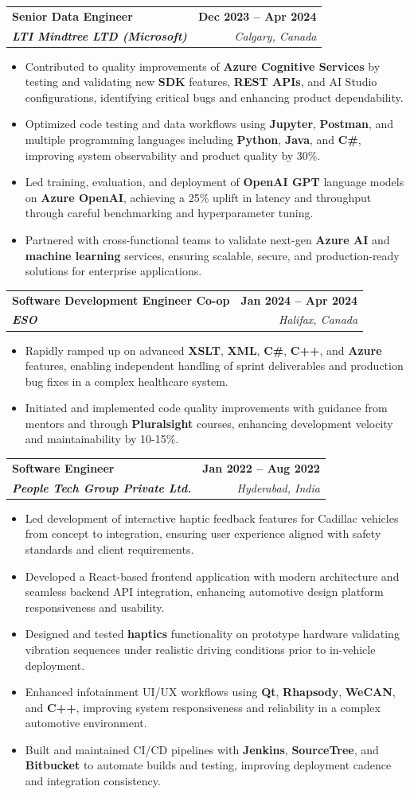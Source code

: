 \documentclass[letterpaper,11pt]{article}
\makeatletter
\newcommand{\resumeItem}[1]{
  \item\small{
    {#1 \vspace{-2pt}}
  }
}
\newcommand{\resumeSubheading}[4]{
  \vspace{-2pt}\item
    \begin{tabular*}{1.0\textwidth}[t]{l@{\extracolsep{\fill}}r}
      \textbf{#1} & \textbf{\small #2} \\
      \textit{\small#3} & \textit{\small #4} \\
    \end{tabular*}\vspace{-7pt}
}
\newcommand{\resumeItemListStart}{\begin{itemize}}
\newcommand{\resumeItemListEnd}{\end{itemize}\vspace{-5pt}}
\makeatother
\begin{document}
    \resumeSubheading
      {\textbf{Senior Data Engineer}}{\textbf{Dec 2023 -- Apr 2024}}
      {\textbf{LTI Mindtree LTD (Microsoft)}}{Calgary, Canada}
      \resumeItemListStart
        \resumeItem{Contributed to quality improvements of \textbf{Azure Cognitive Services} by testing and validating new \textbf{SDK} features, \textbf{REST APIs}, and AI Studio configurations, identifying critical bugs and enhancing product dependability.}
        \resumeItem{Optimized code testing and data workflows using \textbf{Jupyter}, \textbf{Postman}, and multiple programming languages including \textbf{Python}, \textbf{Java}, and \textbf{C\#}, improving system observability and product quality by 30\%.}
        \resumeItem{Led training, evaluation, and deployment of \textbf{OpenAI GPT} language models on \textbf{Azure OpenAI}, achieving a 25\% uplift in latency and throughput through careful benchmarking and hyperparameter tuning.}
        \resumeItem{Partnered with cross-functional teams to validate next-gen \textbf{Azure AI} and \textbf{machine learning} services, ensuring scalable, secure, and production-ready solutions for enterprise applications.}
      \resumeItemListEnd
    
    \resumeSubheading
      {\textbf{Software Development Engineer Co-op}}{\textbf{Jan 2024 -- Apr 2024}}
      {\textbf{ESO}}{Halifax, Canada}
      \resumeItemListStart
        \resumeItem{Rapidly ramped up on advanced \textbf{XSLT}, \textbf{XML}, \textbf{C\#}, \textbf{C++}, and \textbf{Azure} features, enabling independent handling of sprint deliverables and production bug fixes in a complex healthcare system.}
        \resumeItem{Initiated and implemented code quality improvements with guidance from mentors and through \textbf{Pluralsight} courses, enhancing development velocity and maintainability by 10-15\%.}
      \resumeItemListEnd

    \resumeSubheading
      {\textbf{Software Engineer}}{\textbf{Jan 2022 -- Aug 2022}}
      {\textbf{People Tech Group Private Ltd.}}{Hyderabad, India}
      \resumeItemListStart
        \resumeItem{Led development of interactive haptic feedback features for Cadillac vehicles from concept to integration, ensuring user experience aligned with safety standards and client requirements.}
        \resumeItem{Developed a React-based frontend application with modern architecture and seamless backend API integration, enhancing automotive design platform responsiveness and usability.}
        \resumeItem{Designed and tested \textbf{haptics} functionality on prototype hardware validating vibration sequences under realistic driving conditions prior to in-vehicle deployment.}
        \resumeItem{Enhanced infotainment UI/UX workflows using \textbf{Qt}, \textbf{Rhapsody}, \textbf{WeCAN}, and \textbf{C++}, improving system responsiveness and reliability in a complex automotive environment.}
        \resumeItem{Built and maintained CI/CD pipelines with \textbf{Jenkins}, \textbf{SourceTree}, and \textbf{Bitbucket} to automate builds and testing, improving deployment cadence and integration consistency.}
      \resumeItemListEnd
\end{document}
